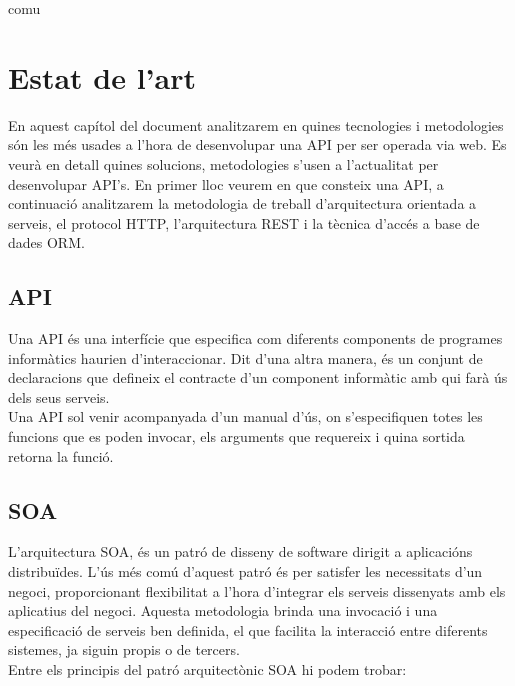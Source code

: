  comu%

\chapter{Estat de l'art}\label{entorn}
En aquest capítol del document analitzarem en quines tecnologies i metodologies són les més usades a l'hora de desenvolupar una \ac{API} per ser operada via web. Es veurà en detall quines solucions, metodologies s'usen a l'actualitat per desenvolupar \ac{API}'s. En primer lloc veurem en que consteix una \ac{API}, a continuació analitzarem la metodologia de treball d'arquitectura orientada a serveis, el protocol \ac{HTTP}, l'arquitectura \ac{REST} i la tècnica d'accés a base de dades \ac{ORM}.
\section{\ac{API}}\label{sec_api}
Una \ac{API} és una interfície que especifica com diferents components de programes informàtics haurien d'interaccionar. Dit d'una altra manera, és un conjunt de declaracions que defineix el contracte d'un component informàtic amb qui farà ús dels seus serveis.\\

Una \ac{API} sol venir acompanyada d'un manual d'ús, on s'especifiquen totes les funcions que es poden invocar, els arguments que requereix i quina sortida retorna la funció.
\section{\ac{SOA}}

L'arquitectura \ac{SOA}, és un patró de disseny de software dirigit a aplicacións distribuïdes. L'ús més comú d'aquest patró és per satisfer les necessitats d'un negoci, proporcionant flexibilitat a l'hora d'integrar els serveis dissenyats amb els aplicatius del negoci. Aquesta metodologia brinda una invocació i una especificació de serveis ben definida, el que facilita la interacció entre diferents sistemes, ja siguin propis o de tercers.\\
\newline
Entre els principis del patró arquitectònic \ac{SOA} hi podem trobar:

